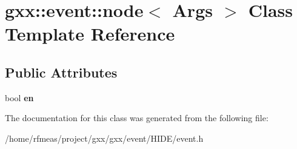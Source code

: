 \hypertarget{classgxx_1_1event_1_1node}{}\section{gxx\+:\+:event\+:\+:node$<$ Args $>$ Class Template Reference}
\label{classgxx_1_1event_1_1node}
\subsection*{Public Attributes}
\begin{DoxyCompactItemize}
\item 
bool {\bfseries en}\hypertarget{classgxx_1_1event_1_1node_a54888f553a4f28b800643e2a93c89268}{}\label{classgxx_1_1event_1_1node_a54888f553a4f28b800643e2a93c89268}

\end{DoxyCompactItemize}


The documentation for this class was generated from the following file\+:\begin{DoxyCompactItemize}
\item 
/home/rfmeas/project/gxx/gxx/event/\+H\+I\+D\+E/event.\+h\end{DoxyCompactItemize}
